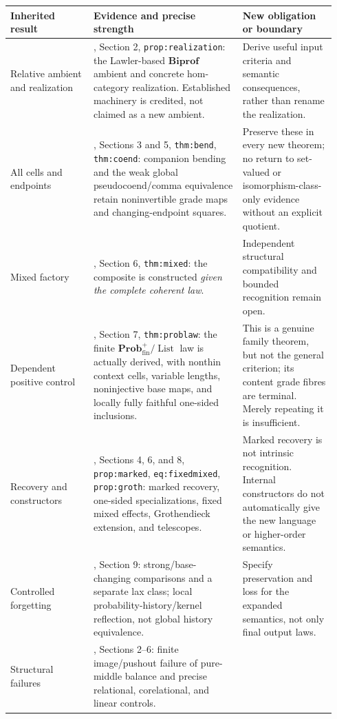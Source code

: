 \documentclass[11pt,a4paper]{article}
\newcommand{\Biprof}{\mathbf{Biprof}}
\newcommand{\Prob}{\mathbf{Prob}^{+}_{\mathrm{fin}}}
\newcommand{\List}{\operatorname{List}}
\begin{document}
\begin{longtable}{@{}p{0.24\linewidth}p{0.43\linewidth}p{0.27\linewidth}@{}}
\toprule
Inherited result & Evidence and precise strength & New obligation or boundary \\
\midrule
\endhead
Relative ambient and realization &
\cite{Unified}, Section 2, \texttt{prop:realization}: the Lawler-based
\(\Biprof\) ambient and concrete hom-category realization. Established
machinery is credited, not claimed as a new ambient. &
Derive useful input criteria and semantic consequences, rather than rename
the realization. \\
All cells and endpoints &
\cite{Unified}, Sections 3 and 5, \texttt{thm:bend}, \texttt{thm:coend}:
companion bending and the weak global pseudocoend/comma equivalence retain
noninvertible grade maps and changing-endpoint squares. &
Preserve these in every new theorem; no return to set-valued or
isomorphism-class-only evidence without an explicit quotient. \\
Mixed factory &
\cite{Unified}, Section 6, \texttt{thm:mixed}: the composite is constructed
\emph{given the complete coherent law}. &
Independent structural compatibility and bounded recognition remain open. \\
Dependent positive control &
\cite{Unified}, Section 7, \texttt{thm:problaw}: the finite
\(\Prob/\List\) law is actually derived, with nonthin context cells,
variable lengths, noninjective base maps, and locally fully faithful
one-sided inclusions. &
This is a genuine family theorem, but not the general criterion; its content
grade fibres are terminal. Merely repeating it is insufficient. \\
Recovery and constructors &
\cite{Unified}, Sections 4, 6, and 8, \texttt{prop:marked},
\texttt{eq:fixedmixed}, \texttt{prop:groth}: marked recovery, one-sided
specializations, fixed mixed effects, Grothendieck extension, and telescopes. &
Marked recovery is not intrinsic recognition. Internal constructors do not
automatically give the new language or higher-order semantics. \\
Controlled forgetting &
\cite{Unified}, Section 9: strong/base-changing comparisons and a separate
lax class; local probability-history/kernel reflection, not global history
equivalence. &
Specify preservation and loss for the expanded semantics, not only final
output laws. \\
Structural failures &
\cite{Reduction}, Sections 2--6: finite image/pushout failure of pure-middle
balance and precise relational, corelational, and linear controls.

\end{longtable}
\end{document}

